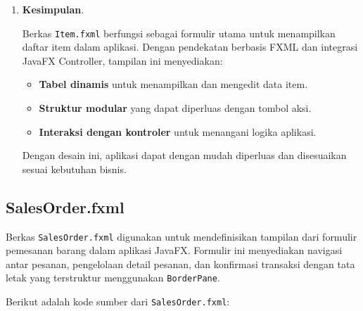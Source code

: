 \begin{enumerate}
	\item \textbf{Kesimpulan}.
	
	Berkas \texttt{Item.fxml} berfungsi sebagai formulir utama untuk menampilkan daftar item dalam aplikasi. Dengan pendekatan berbasis FXML dan integrasi JavaFX Controller, tampilan ini menyediakan:
	
	\begin{itemize}
		\item \textbf{Tabel dinamis} untuk menampilkan dan mengedit data item.
		\item \textbf{Struktur modular} yang dapat diperluas dengan tombol aksi.
		\item \textbf{Interaksi dengan kontroler} untuk menangani logika aplikasi.
	\end{itemize}
	
	Dengan desain ini, aplikasi dapat dengan mudah diperluas dan disesuaikan sesuai kebutuhan bisnis.
\end{enumerate}

\subsection{SalesOrder.fxml}

Berkas \texttt{SalesOrder.fxml} digunakan untuk mendefinisikan tampilan dari formulir pemesanan barang dalam aplikasi JavaFX. Formulir ini menyediakan navigasi antar pesanan, pengelolaan detail pesanan, dan konfirmasi transaksi dengan tata letak yang terstruktur menggunakan \texttt{BorderPane}. 

Berikut adalah kode sumber dari \texttt{SalesOrder.fxml}:

